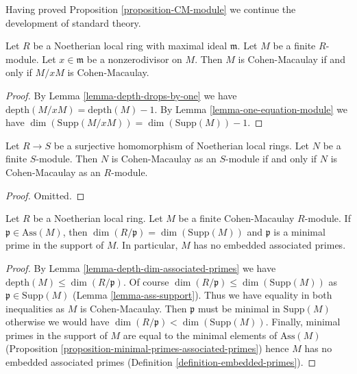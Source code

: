 \noindent
Having proved Proposition \ref{proposition-CM-module} we continue the
development of standard theory.

\begin{lemma}
\label{lemma-nonzerodivisor-on-CM}
Let $R$ be a Noetherian local ring with maximal ideal $\mathfrak m$.
Let $M$ be a finite $R$-module. Let $x \in \mathfrak m$ be a
nonzerodivisor on $M$. Then $M$ is Cohen-Macaulay if and only
if $M/xM$ is Cohen-Macaulay.
\end{lemma}

\begin{proof}
By Lemma \ref{lemma-depth-drops-by-one} we have
$\text{depth}(M/xM) = \text{depth}(M)-1$.
By Lemma \ref{lemma-one-equation-module}
we have $\dim(\text{Supp}(M/xM)) = \dim(\text{Supp}(M)) - 1$.
\end{proof}

\begin{lemma}
\label{lemma-CM-over-quotient}
Let $R \to S$ be a surjective homomorphism of Noetherian local rings.
Let $N$ be a finite $S$-module. Then $N$ is Cohen-Macaulay as an $S$-module
if and only if $N$ is Cohen-Macaulay as an $R$-module.
\end{lemma}

\begin{proof}
Omitted.
\end{proof}

\begin{lemma}
\label{lemma-CM-ass-minimal-support}
\begin{reference}
\cite[Chapter 0, Proposition 16.5.4]{EGA}
\end{reference}
Let $R$ be a Noetherian local ring. Let $M$ be a finite Cohen-Macaulay
$R$-module. If $\mathfrak p \in \text{Ass}(M)$, then
$\dim(R/\mathfrak p) = \dim(\text{Supp}(M))$ and $\mathfrak p$
is a minimal prime in the support of $M$.
In particular, $M$ has no embedded associated primes.
\end{lemma}

\begin{proof}
By Lemma \ref{lemma-depth-dim-associated-primes} we have
$\text{depth}(M) \leq \dim(R/\mathfrak p)$.
Of course $\dim(R/\mathfrak p) \leq \dim(\text{Supp}(M))$
as $\mathfrak p \in \text{Supp}(M)$ (Lemma \ref{lemma-ass-support}).
Thus we have equality in both inequalities as $M$ is Cohen-Macaulay.
Then $\mathfrak p$ must be minimal in $\text{Supp}(M)$ otherwise
we would have $\dim(R/\mathfrak p) < \dim(\text{Supp}(M))$.
Finally, minimal primes in the support of $M$ are equal to
the minimal elements of $\text{Ass}(M)$
(Proposition \ref{proposition-minimal-primes-associated-primes})
hence $M$ has no embedded associated primes
(Definition \ref{definition-embedded-primes}).
\end{proof}

